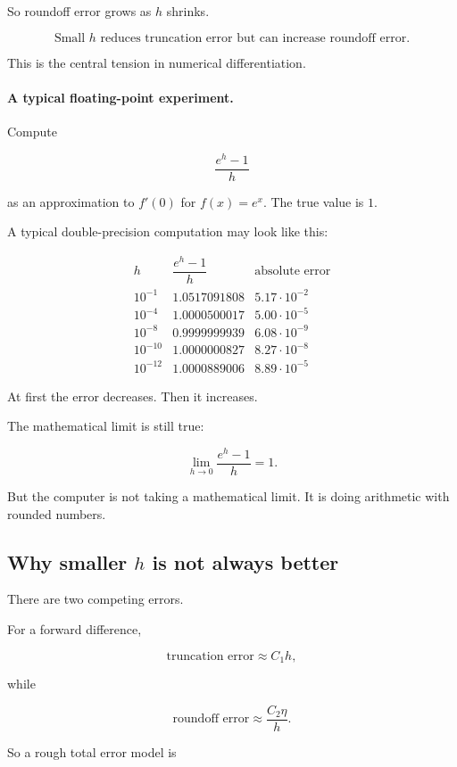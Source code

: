 So roundoff error grows as \(h\) shrinks.

\[
\boxed{
\text{Small \(h\) reduces truncation error but can increase roundoff error.}
}
\]

This is the central tension in numerical differentiation.

\paragraph{A typical floating-point experiment.}
Compute

\[
\frac{e^h-1}{h}
\]

as an approximation to \(f'(0)\) for \(f(x)=e^x\).  The true value is \(1\).

A typical double-precision computation may look like this:

\[
\begin{array}{c|c|c}
h & \dfrac{e^h-1}{h} & \text{absolute error} \\ \hline
10^{-1} & 1.0517091808 & 5.17\cdot10^{-2} \\
10^{-4} & 1.0000500017 & 5.00\cdot10^{-5} \\
10^{-8} & 0.9999999939 & 6.08\cdot10^{-9} \\
10^{-10} & 1.0000000827 & 8.27\cdot10^{-8} \\
10^{-12} & 1.0000889006 & 8.89\cdot10^{-5}
\end{array}
\]

At first the error decreases.  Then it increases.

The mathematical limit is still true:

\[
\lim_{h\to0}\frac{e^h-1}{h}=1.
\]

But the computer is not taking a mathematical limit.  It is doing arithmetic with rounded
numbers.

\subsection{Why smaller \texorpdfstring{\(h\)}{h} is not always better}
\label{subsec:why-smaller-h-not-always-better}

There are two competing errors.

For a forward difference,

\[
\text{truncation error}\approx C_1h,
\]

while

\[
\text{roundoff error}\approx \frac{C_2\eta}{h}.
\]

So a rough total error model is

